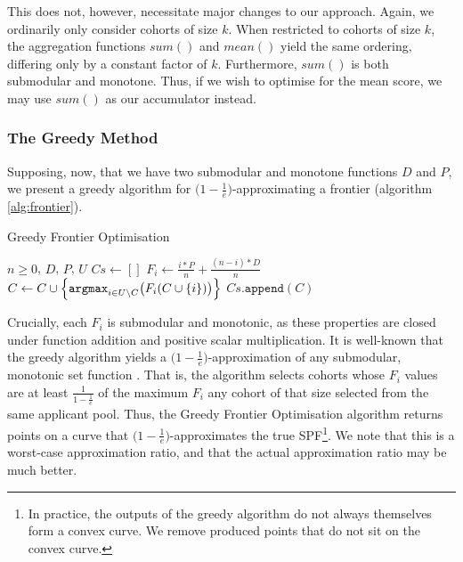 This does not, however, necessitate major changes to our approach. Again, we ordinarily only consider cohorts of size $k$. When restricted to cohorts of size $k$, the aggregation functions $sum()$ and $mean()$ yield the same ordering, differing only by a constant factor of $k$. Furthermore, $sum()$ is both submodular and monotone. Thus, if we wish to optimise for the mean score, we may use $sum()$ as our accumulator instead.

\subsubsection{The Greedy Method}
Supposing, now, that we have two submodular and monotone functions $D$ and $P$, we present a greedy algorithm for $\bigl( 1-\frac{1}{e} \bigr)$-approximating a frontier (algorithm \ref{alg:frontier}).

\begin{algorithm}
    \caption{Greedy Frontier Optimisation}\label{alg:frontier}
    \begin{algorithmic}
        \Require $n \geq 0$, $D$, $P$, $U$
        \State $Cs \gets []$
            \State $F_i \gets \frac{i*P}{n}+\frac{(n-i)*D}{n}$
                \State $C \gets C \cup \Bigl\{ \texttt{argmax}_{i \in U \setminus C}\bigl(F_i(C \cup \{i\} ) \bigr) \Bigr\}$
            \EndWhile
            \State $Cs.\texttt{append}(C)$
        \EndFor
    \end{algorithmic}
\end{algorithm}

Crucially, each $F_i$ is submodular and monotonic, as these properties are closed under function addition and positive scalar multiplication. It is well-known that the greedy algorithm yields a $\bigl( 1-\frac{1}{e} \bigr)$-approximation of any submodular, monotonic set function \cite{bordeaux_submodular_2014}. That is, the algorithm selects cohorts whose $F_i$ values are at least $\frac{1}{1-\frac{1}{e}}$ of the maximum $F_i$ any cohort of that size selected from the same applicant pool. Thus, the Greedy Frontier Optimisation algorithm returns points on a curve that $\bigl( 1-\frac{1}{e} \bigr)$-approximates the true SPF\footnote{In practice, the outputs of the greedy algorithm do not always themselves form a convex curve. We remove produced points that do not sit on the convex curve.}. We note that this is a worst-case approximation ratio, and that the actual approximation ratio may be much better.

